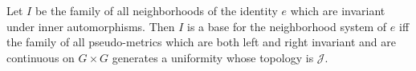 Let $I$ be the family of all neighborhoods of the identity $e$ which are invariant under inner automorphisms. Then $I$ is a base for the neighborhood system of $e$ iff the family of all pseudo-metrics which are both left and right invariant and are continuous on $G \times G$ generates a uniformity whose topology is $\mathcal{J}$.
